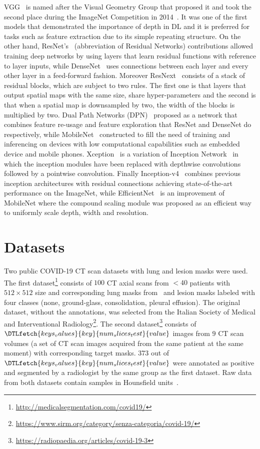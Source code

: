 \documentclass[journal]{IEEEtran}
\begin{document}
VGG~\cite{simonyan2014very} is named after the Visual Geometry Group that proposed it and took the second place during the ImageNet Competition in 2014~\cite{deng2009imagenet}.
It was one of the first models that demonstrated the importance of depth in DL and it is preferred for tasks such as feature extraction due to its simple repeating structure.
On the other hand, ResNet's~\cite{he2016deep} (abbreviation of Residual Networks) contributions allowed training deep networks by using layers that learn residual functions with reference to layer inputs, while DenseNet~\cite{huang2017densely} uses connections between each layer and every other layer in a feed-forward fashion.
Moreover ResNext~\cite{xie2017aggregated} consists of a stack of residual blocks, which are subject to two rules.
The first one is that layers that output spatial maps with the same size, share hyper-parameters and the second is that when a spatial map is downsampled by two, the width of the blocks is multiplied by two.
Dual Path Networks (DPN)~\cite{chen2017dual} proposed as a network that combines feature re-usage and feature exploration that ResNet and DenseNet do respectively, while MobileNet~\cite{howard2017mobilenets} constructed to fill the need of training and inferencing on devices with low computational capabilities such as embedded device and mobile phones.
Xception~\cite{chollet2017xception} is a variation of Inception Network~\cite{szegedy2015going} in which the inception modules have been replaced with depthwise convolutions followed by a pointwise convolution.
Finally Inception-v4~\cite{szegedy2017inception} combines previous inception architectures with residual connections achieving state-of-the-art performance on the ImageNet, while EfficientNet~\cite{tan2019efficientnet} is an improvement of MobileNet where the compound scaling module was proposed as an efficient way to uniformly scale depth, width and resolution.

\section{Datasets}
\label{sec:datasets}
Two public COVID-19 CT scan datasets with lung and lesion masks were used.
The first dataset\footnote{\url{http://medicalsegmentation.com/covid19/}} consists of $100$ CT axial scans from $<40$ patients with $512\times 512$ size and corresponding lung masks from~\cite{hofmanninger2020automatic} and lesion masks labeled with four classes (none, ground-glass, consolidation, pleural effusion).
The original dataset, without the annotations, was selected from the Italian Society of Medical and Interventional Radiology\footnote{\url{https://www.sirm.org/category/senza-categoria/covid-19/}}.
The second dataset\footnote{\url{https://radiopaedia.org/articles/covid-19-3}} consists of $\DTLfetch{keys_values}{key}{num_slices_test}{value}$ images from $9$ CT scan volumes (a set of CT scan images acquired from the same patient at the same moment) with corresponding target masks.
373 out of $\DTLfetch{keys_values}{key}{num_slices_test}{value}$ were annotated as positive and segmented by a radiologist by the same group as the first dataset.
Raw data from both datasets contain samples in Hounsfield units~\cite{schneider1996calibration}.
\end{document}
